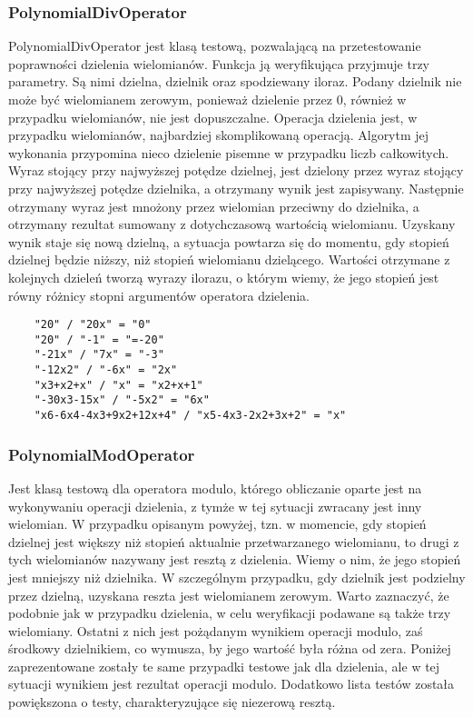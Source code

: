 \documentclass[oneside,a4paper]{book}
\begin{document}
	\subsubsection{PolynomialDivOperator}
	
	PolynomialDivOperator jest klasą testową, pozwalającą na przetestowanie poprawności dzielenia wielomianów. Funkcja ją weryfikująca przyjmuje trzy parametry. Są nimi dzielna, dzielnik oraz spodziewany iloraz. Podany dzielnik nie może być wielomianem zerowym, ponieważ dzielenie przez $0$, również w przypadku wielomianów, nie jest dopuszczalne. Operacja dzielenia jest, w przypadku wielomianów, najbardziej skomplikowaną operacją. Algorytm jej wykonania przypomina nieco dzielenie pisemne w przypadku liczb całkowitych. Wyraz stojący przy najwyższej potędze dzielnej, jest dzielony przez wyraz stojący przy najwyższej potędze dzielnika, a otrzymany wynik jest zapisywany. Następnie otrzymany wyraz jest mnożony przez wielomian przeciwny do dzielnika, a otrzymany rezultat sumowany z dotychczasową wartością wielomianu. Uzyskany wynik staje się nową dzielną, a sytuacja powtarza się do momentu, gdy stopień dzielnej będzie niższy, niż stopień wielomianu dzielącego. Wartości otrzymane z kolejnych dzieleń tworzą wyrazy ilorazu, o którym wiemy, że jego stopień jest równy różnicy stopni argumentów operatora dzielenia.
	
	\begin{lstlisting}
	"20" / "20x" = "0"
	"20" / "-1" = "=-20"
	"-21x" / "7x" = "-3"
	"-12x2" / "-6x" = "2x"
	"x3+x2+x" / "x" = "x2+x+1"
	"-30x3-15x" / "-5x2" = "6x"
	"x6-6x4-4x3+9x2+12x+4" / "x5-4x3-2x2+3x+2" = "x"
	\end{lstlisting}
	
	\subsubsection{PolynomialModOperator}
	
	Jest klasą testową dla operatora modulo, którego obliczanie oparte jest na wykonywaniu operacji dzielenia, z tymże w tej sytuacji zwracany jest inny wielomian. W przypadku opisanym powyżej, tzn. w momencie, gdy stopień dzielnej jest większy niż stopień aktualnie przetwarzanego wielomianu, to drugi z tych wielomianów nazywany jest resztą z dzielenia. Wiemy o nim, że jego stopień jest mniejszy niż dzielnika. W szczególnym przypadku, gdy dzielnik jest podzielny przez dzielną, uzyskana reszta jest wielomianem zerowym. Warto zaznaczyć, że podobnie jak w przypadku dzielenia, w celu weryfikacji podawane są także trzy wielomiany. Ostatni z nich jest pożądanym wynikiem operacji modulo, zaś środkowy dzielnikiem, co wymusza, by jego wartość była różna od zera. Poniżej zaprezentowane zostały te same przypadki testowe jak dla dzielenia, ale w tej sytuacji wynikiem jest rezultat operacji modulo. Dodatkowo lista testów została powiększona o testy, charakteryzujące się niezerową resztą.
	
\end{document}
